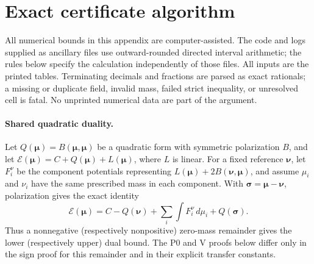 \section{Exact certificate algorithm}
\label{sec:certificate-algorithm}
All numerical bounds in this appendix are computer-assisted.  The code and
logs supplied as ancillary files use outward-rounded directed interval
arithmetic; the rules below specify the calculation independently of those
files.  All inputs are the printed tables. Terminating decimals and fractions are
parsed as exact rationals; a missing or duplicate field, invalid mass, failed
strict inequality, or unresolved cell is fatal. No unprinted numerical data
are part of the argument.

\paragraph{Shared quadratic duality.}
Let $Q(\boldsymbol\mu)=B(\boldsymbol\mu,\boldsymbol\mu)$ be a quadratic
form with symmetric polarization $B$, and let
$\mathcal E(\boldsymbol\mu)=C+Q(\boldsymbol\mu)+L(\boldsymbol\mu)$, where
$L$ is linear. For a fixed reference $\boldsymbol\nu$, let $F_i^\nu$ be
the component potentials representing
$L(\boldsymbol\mu)+2B(\boldsymbol\nu,\boldsymbol\mu)$, and assume
$\mu_i$ and $\nu_i$ have the same prescribed mass in each component. With
$\boldsymbol\sigma=\boldsymbol\mu-\boldsymbol\nu$, polarization gives the
exact identity
\[
 \mathcal E(\boldsymbol\mu)=C-Q(\boldsymbol\nu)
       +\sum_i\int F_i^\nu\,d\mu_i+Q(\boldsymbol\sigma).
\]
Thus a nonnegative (respectively nonpositive) zero-mass remainder gives the
lower (respectively upper) dual bound. The P0 and V proofs below differ only
in the sign proof for this remainder and in their explicit transfer constants.

